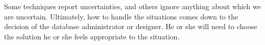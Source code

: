Some techniques report uncertainties, and others ignore anything about which we are uncertain. Ultimately, how to handle the situations comes down to the decision of the database administrator or designer. He or she will need to choose the solution he or she feels appropriate to the situation. 






